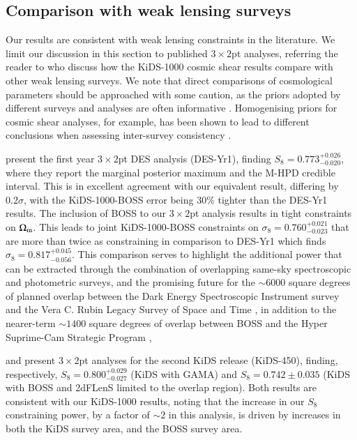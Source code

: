 \subsection{Comparison with weak lensing surveys}
\label{sec:WL_comp}
Our results are consistent with weak lensing constraints in the literature.   We limit our discussion in this section to published $3\times2$pt analyses, referring the reader to \citet{asgari/etal:inprep} who discuss how the KiDS-1000 cosmic shear results compare with other weak lensing surveys.   We note that direct comparisons of cosmological parameters should be approached with some caution, as the priors adopted by different surveys and analyses are often informative \citep[see section 6.1 in][]{joachimi/etal:inprep}.   Homogenising priors for cosmic shear analyses, for example, has been shown to lead to different conclusions when assessing inter-survey consistency \citep{chang/etal:2019, joudaki/etal:2020, asgari/etal:2020_KD}.   

\citet{abbott/etal:2018} present the first year $3\times2$pt DES analysis (DES-Yr1), finding $S_8=0.773^{+0.026}_{-0.020}$, where they report the marginal posterior maximum and the M-HPD credible interval.   This is in excellent agreement with our equivalent result, differing by $0.2\sigma$, with the KiDS-1000-BOSS error being 30\% tighter than the DES-Yr1 results.  The inclusion of BOSS to our  $3\times2$pt  analysis results in tight constraints on $\Omega_{\rm m}$.   This leads to joint KiDS-1000-BOSS constraints on $\sigma_8=0.760^{+0.021}_{-0.023}$ that are more than twice as constraining in comparison to DES-Yr1 which finds $\sigma_8=0.817^{+0.045}_{-0.056}$.   This comparison serves to highlight the additional power that can be extracted through the combination of overlapping same-sky spectroscopic and photometric surveys,  and the promising future for the $\sim 6000$ square degrees of planned overlap between the Dark Energy Spectroscopic Instrument survey \citep{DESI/etal:2016} and the Vera C. Rubin Legacy Survey of Space and Time \citep{lsst/etal:2009}, in addition to the nearer-term $\sim 1400$ square degrees of overlap between BOSS and the Hyper Suprime-Cam Strategic Program \citep[HSC,][]{aihara/etal:2019}, 

\citet{vanuitert/etal:2018} and \citet{joudaki/etal:2018} present $3\times2$pt analyses for the second KiDS release (KiDS-450), finding, respectively, $S_8 = 0.800_{-0.027}^{+0.029}$ (KiDS with GAMA) and $S_8 = 0.742 \pm 0.035$ (KiDS with BOSS and 2dFLenS limited to the overlap region).   Both results are consistent with our KiDS-1000 results, noting that the increase in our $S_8$ constraining power, by a factor of $\sim 2$ in this analysis, is driven by increases in both the KiDS survey area, and the BOSS survey area.  

